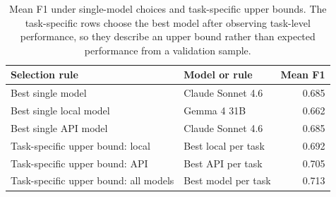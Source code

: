 \begin{table}[H]
\centering
\caption{Mean F1 under single-model choices and task-specific upper bounds. The task-specific rows choose the best model after observing task-level performance, so they describe an upper bound rather than expected performance from a validation sample. \label{tab:model-selection-value}}
\centering
\fontsize{9}{11}\selectfont
\begin{tabular}[t]{llr}
\toprule
Selection rule & Model or rule & Mean F1\\
\midrule
Best single model & Claude Sonnet 4.6 & 0.685\\
Best single local model & Gemma 4 31B & 0.662\\
Best single API model & Claude Sonnet 4.6 & 0.685\\
Task-specific upper bound: local & Best local per task & 0.692\\
Task-specific upper bound: API & Best API per task & 0.705\\
\addlinespace
Task-specific upper bound: all models & Best model per task & 0.713\\
\bottomrule
\end{tabular}
\end{table}
